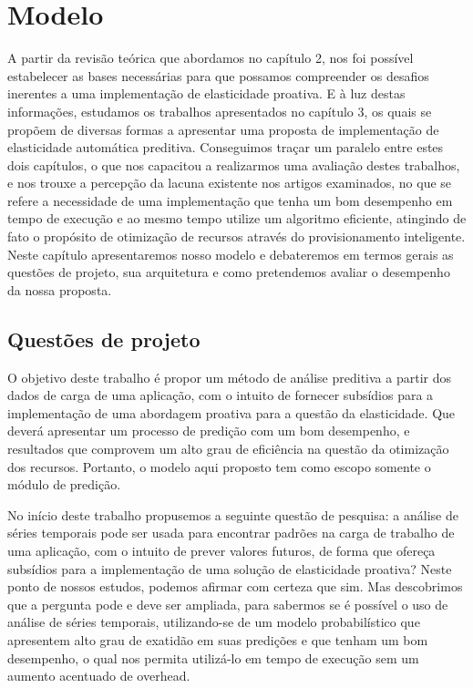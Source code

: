 \documentclass[twoside,english,brazilian]{UNISINOSmonografia}
\begin{document}
\chapter{Modelo}
A partir da revisão teórica que abordamos no capítulo 2, nos foi possível estabelecer as bases necessárias para que possamos compreender os desafios inerentes a uma implementação de elasticidade proativa. E à luz destas informações, estudamos os trabalhos apresentados no capítulo 3, os quais se propõem de diversas formas a apresentar uma proposta de implementação de elasticidade automática preditiva. Conseguimos traçar um paralelo entre estes dois capítulos, o que nos capacitou a realizarmos uma avaliação destes trabalhos, e nos trouxe a percepção da lacuna existente nos artigos examinados, no que se refere a necessidade de uma implementação que tenha um bom desempenho em tempo de execução e ao mesmo tempo utilize um algoritmo eficiente, atingindo de fato o propósito de otimização de recursos através do provisionamento inteligente. Neste capítulo apresentaremos nosso modelo e debateremos em termos gerais as questões de projeto, sua arquitetura e como pretendemos avaliar o desempenho da nossa proposta.

\section{Questões de projeto}
O objetivo deste trabalho é propor um método de análise preditiva a partir dos dados de carga de uma aplicação, com o intuito de fornecer subsídios para a implementação de uma abordagem proativa para a questão da elasticidade. Que deverá apresentar um processo de predição com um bom desempenho, e resultados que comprovem um alto grau de eficiência na questão da otimização dos recursos. Portanto, o modelo aqui proposto tem como escopo somente o módulo de predição.

No início deste trabalho propusemos a seguinte questão de pesquisa: a análise de séries temporais pode ser usada para encontrar padrões na carga de trabalho de uma aplicação, com o intuito de prever valores futuros, de forma que ofereça subsídios para a implementação de uma solução de elasticidade proativa? Neste ponto de nossos estudos, podemos afirmar com certeza que sim. Mas descobrimos que a pergunta pode e deve ser ampliada, para sabermos se é possível o uso de análise de séries temporais, utilizando-se de um modelo probabilístico que apresentem alto grau de exatidão em suas predições e que tenham um bom desempenho, o qual nos permita utilizá-lo em tempo de execução sem um aumento acentuado de overhead.
\end{document}
